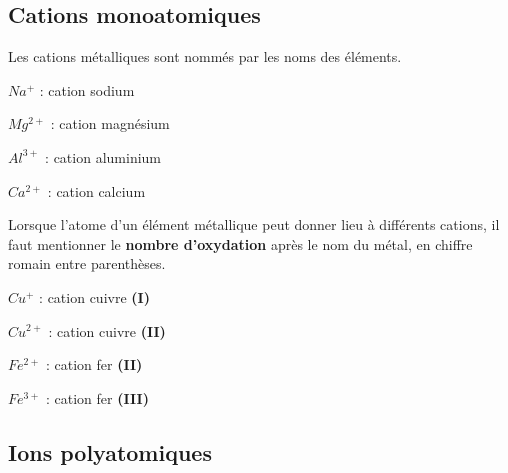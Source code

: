 \documentclass[
  11pt,
  a4paper,
  openany]{book}
\begin{document}
\subsection{Cations monoatomiques}\label{cations-monoatomiques}

Les cations métalliques sont nommés par les noms des éléments.

\begin{multicols}{3}
\(Na^+\) : cation sodium

\(Mg^{2+}\) : cation magnésium

\(Al^{3+}\) : cation aluminium

\(Ca^{2+}\) : cation calcium

\end{multicols}

Lorsque l'atome d'un élément métallique peut donner lieu à différents cations, il faut mentionner le \textbf{nombre d'oxydation} après le nom du métal, en chiffre romain entre parenthèses.

\begin{multicols}{3}
\(Cu^+\) : cation cuivre \textbf{(I)}

\(Cu^{2+}\) : cation cuivre \textbf{(II)}

\(Fe^{2+}\) : cation fer \textbf{(II)}

\(Fe^{3+}\) : cation fer \textbf{(III)}

\end{multicols}

\subsection{Ions polyatomiques}\label{ions-polyatomiques}
\end{document}
